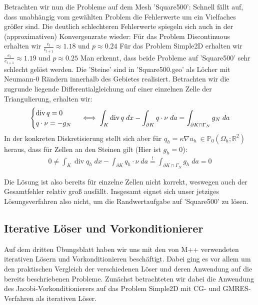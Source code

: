 \documentclass[12pt,a4paper]{scrartcl}
\newcommand{\R}{\mathbb{R}}
\DeclareMathOperator{\dive}{div}
\numberwithin{equation}{section}
\begin{document}
\begin{enumerate}[label=(\roman*)]
Betrachten wir nun die Probleme auf dem Mesh 'Square500': Schnell fällt auf, dass unabhängig vom gewählten Problem die Fehlerwerte um ein Vielfaches größer sind. Die deutlich schlechteren Fehlerwerte spiegeln sich auch in der (approximativen) Konvergenzrate wieder: \newline
Für das Problem Discontinuous erhalten wir $ \frac{e_l}{e_{l+1}} \approx 1.18 $ und $p \approx 0.24$ \newline
Für das Problem Simple2D erhalten wir $ \frac{e_l}{e_{l+1}} \approx 1.19 $ und $p \approx 0.25$ \newline
Man erkennt, dass beide Probleme auf 'Square500' sehr schlecht gelöst werden.
Die 'Steine' sind in 'Square500.geo' als Löcher mit Neumann-0 Rändern innerhalb des Gebietes realisiert. 
Betrachten wir die zugrunde liegende Differentialgleichung auf einer einzelnen Zelle der Triangulierung, erhalten wir:
\begin{align*}
	\begin{cases}
		\dive q = 0 \\
			q \cdot \nu = -g_N 
	\end{cases}
	\iff \int_K{ \dive q \; dx} - \int_{ \partial K}{q\cdot \nu \; da} = \int_{ \partial K \cap \Gamma_N} {g_N \; da } 
\newline	
\end{align*}
In der konkreten Diskretisierung stellt sich aber für $q_h = \kappa \nabla u_h \ \in \mathbb{P}_0( \Omega_h ; \R^2) $ heraus, dass für Zellen an den Steinen gilt (Hier ist $g_h = 0$): 
\begin{align*}	
	 0 \neq \int_K{ \dive q_h \; dx} - \int_{ \partial K}{q_h \cdot \nu \; da} \stackrel{!}{=} \int_{ \partial K \cap \Gamma_N} {g_h \; da } = 0 
\end{align*}

Die Lösung ist also bereits für einzelne Zellen nicht korrekt, weswegen auch der Gesamtfehler relativ groß ausfällt. Insgesamt eignet sich unser jetziges Lösungsverfahren also nicht, um die Randwertaufgabe auf 'Square500' zu lösen.




\end{enumerate}

\subsection{Iterative Löser und Vorkonditionierer}

Auf dem dritten Übungsblatt haben wir uns mit den von M++ verwendeten iterativen Lösern und Vorkonditionieren beschäftigt.
Dabei ging es vor allem um den praktischen Vergleich der verschiedenen Löser und deren Anwendung auf die bereits beschriebenen Probleme.
Zunächst betrachteten wir dabei die Anwendung des Jacobi-Vorkonditionierers auf das Problem Simple2D mit CG- und GMRES-Verfahren als iterativen Löser.
\end{document}
